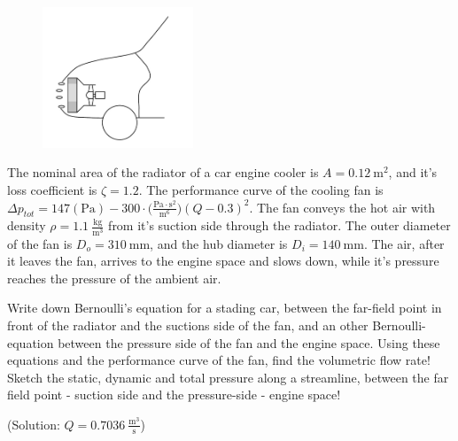 \vspace{1cm}

\begin{figure}
\includegraphics[width=0.4\textwidth]{Problem_solving/figs/car-engine-cooler.JPG}
\end{figure}

The nominal area of the radiator of a car engine cooler is $A=0.12~\mathrm{m^2}$, and it's loss coefficient is $\zeta = 1.2$. The performance curve of the cooling fan is $\Delta p_{tot} = 147 (\mathrm{Pa}) - 300\cdot \Big(\frac{\mathrm{Pa}\cdot\mathrm{s^2}}{\mathrm{m^6}} \Big)(Q-0.3)^2$. The fan conveys the hot air with density $\rho=1.1~\frac{\mathrm{kg}}{\mathrm{m^3}}$ from it's suction side through the radiator. The outer diameter of the fan is $D_o = 310~\mathrm{mm}$, and the hub diameter is $D_i = 140~\mathrm{mm}$. The air, after it leaves the fan, arrives to the engine space and slows down, while it's pressure reaches the pressure of the ambient air. 

Write down Bernoulli's equation for a stading car, between the far-field point in front of the radiator and the suctions side of the fan, and an other Bernoulli-equation between the pressure side of the fan and the engine space. Using these equations and the performance curve of the fan, find the volumetric flow rate! Sketch the static, dynamic and total pressure along a streamline, between the far field point - suction side and the pressure-side - engine space!

(Solution: $Q=0.7036~\frac{\mathrm{m^3}}{\mathrm{s}}$)

\vspace{1cm}

